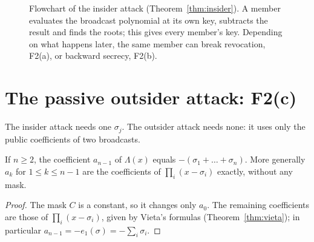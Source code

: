 \begin{figure}[H]
\centering
{}
\caption{Flowchart of the insider attack (Theorem~\ref{thm:insider}). A member evaluates the broadcast polynomial at its own key, subtracts the result and finds the roots; this gives every member's key. Depending on what happens later, the same member can break revocation, F2(a), or backward secrecy, F2(b).}
\label{fig:insiderflow}
\end{figure}



\section{The passive outsider attack: F2(c)}
The insider attack needs one $\sigma_j$. The outsider attack needs none: it uses only the public coefficients of two broadcasts.

\begin{lemma}\label{lem:sum}
If $n\ge2$, the coefficient $a_{n-1}$ of $\Lambda(x)$ equals $-(\sigma_1+\dots+\sigma_n)$. More generally $a_k$ for $1\le k\le n-1$ are the coefficients of
$\prod_i(x-\sigma_i)$ exactly, without any mask.
\end{lemma}
\begin{proof}
The mask $C$ is a constant, so it changes only $a_0$. The remaining coefficients are those of $\prod_i(x-\sigma_i)$, given by Vieta's formulas
(Theorem~\ref{thm:vieta}); in particular $a_{n-1}=-e_1(\sigma)=-\sum_i\sigma_i$.
\end{proof}

